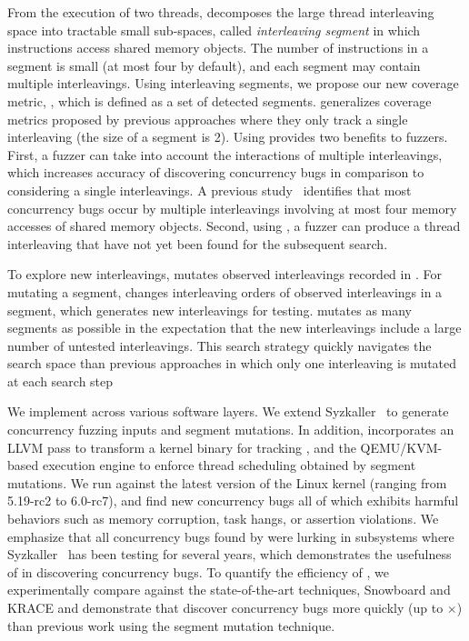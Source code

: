  From the execution of two threads,  
\sys decomposes the large thread interleaving space into tractable 
small sub-spaces, called \textit{interleaving segment} in which
instructions access shared memory objects. The number of instructions 
in a segment is small (at most four by default), and each segment may 
contain multiple interleavings. Using interleaving segments, we propose 
our new coverage metric, \textit{\intcov}, which is defined as a set of detected segments. \Intcov generalizes coverage 
metrics proposed by previous approaches where they only track 
a single interleaving (the size of a segment is 2). 
Using \intcov provides two benefits to fuzzers. First, a fuzzer can 
take into account the interactions of multiple interleavings, which increases
accuracy of discovering concurrency bugs in comparison to considering a single 
interleavings. A previous study~\cite{learningfrommistakes} identifies that
most concurrency bugs occur by multiple interleavings involving 
at most four memory accesses of shared memory objects.
Second, using \intcov, a fuzzer can produce a thread interleaving
that have not yet been found for the subsequent search.

%
To explore new interleavings,
\sys mutates observed interleavings recorded in \intcov. For mutating a segment, \sys changes interleaving orders of observed interleavings 
in a segment, which generates new interleavings for testing. \sys 
mutates as many segments as possible in the expectation that the 
new interleavings include a large number of untested interleavings. 
This search strategy quickly navigates the search space than previous 
approaches in which only one interleaving is mutated at each search step

We implement \sys across various software layers.
We extend Syzkaller~\cite{syzkaller} to generate concurrency fuzzing inputs 
and segment mutations. 
%
In addition, \sys incorporates an LLVM pass to transform a kernel
binary for tracking \intcov, and the QEMU/KVM-based execution engine
to enforce thread scheduling obtained by segment mutations. 
%
We run \sys against the latest version of the Linux kernel (ranging
from 5.19-rc2 to 6.0-rc7), and find new \totalbugs concurrency bugs all of
which exhibits harmful behaviors such as memory corruption,
task hangs, or assertion violations. We emphasize that all
concurrency bugs found by \sys were lurking in subsystems where
Syzkaller~\cite{syzkaller} has been testing for several years, which
demonstrates the usefulness of \sys in discovering concurrency bugs.
%
To quantify the efficiency of \sys, we experimentally compare \sys 
against the state-of-the-art techniques, Snowboard and KRACE and 
demonstrate that \sys discover concurrency bugs more quickly 
(up to $\times$) than previous work using the segment mutation 
technique.

